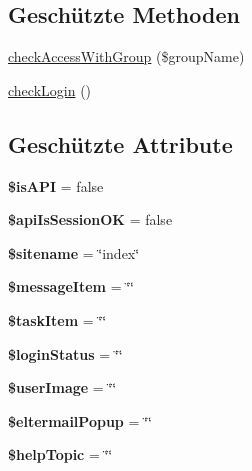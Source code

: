 \subsection*{Geschützte Methoden}
\begin{DoxyCompactItemize}
\item 
\mbox{\hyperlink{class_abstract_page_ae8937960e8881956c8094c89e2e00ac7}{check\+Access\+With\+Group}} (\$group\+Name)
\item 
\mbox{\hyperlink{class_abstract_page_a96a43489593d68c881e90978b447e234}{check\+Login}} ()
\end{DoxyCompactItemize}
\subsection*{Geschützte Attribute}
\begin{DoxyCompactItemize}
\item 
\mbox{\label{class_abstract_page_ae000b8af52cfda4045a12bfd2b2c2beb}} 
{\bfseries \$is\+A\+PI} = false
\item 
\mbox{\label{class_abstract_page_a1bdb95cc2e572bae3c3af95a23091607}} 
{\bfseries \$api\+Is\+Session\+OK} = false
\item 
\mbox{\label{class_abstract_page_a1833ac5ddea499b28f68ff74d844ccb1}} 
{\bfseries \$sitename} = \char`\"{}index\char`\"{}
\item 
\mbox{\label{class_abstract_page_a96e08894b25ceccde3f404c45483b0b7}} 
{\bfseries \$message\+Item} = \char`\"{}\char`\"{}
\item 
\mbox{\label{class_abstract_page_a0399d353c11838fdf89edcc6fc12a01a}} 
{\bfseries \$task\+Item} = \char`\"{}\char`\"{}
\item 
\mbox{\label{class_abstract_page_acf93335a9f4dcf58f768eba238cf816f}} 
{\bfseries \$login\+Status} = \char`\"{}\char`\"{}
\item 
\mbox{\label{class_abstract_page_a41de5768c2edab7405b7cc5f9958b226}} 
{\bfseries \$user\+Image} = \char`\"{}\char`\"{}
\item 
\mbox{\label{class_abstract_page_a6e0352db2dd39eed18bc4c66654a5f9d}} 
{\bfseries \$eltermail\+Popup} = \char`\"{}\char`\"{}
\item 
\mbox{\label{class_abstract_page_a0627a6b4917f3d24d5c7d259c1f1ee7d}} 
{\bfseries \$help\+Topic} = \char`\"{}\char`\"{}
\end{DoxyCompactItemize}


